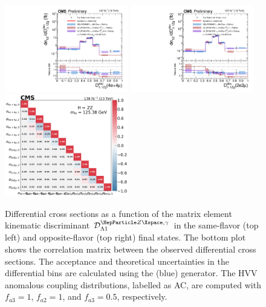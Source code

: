 \clearpage

\begin{center}
	\begin{figure}[!htb]
		\centering
		\includegraphics[width=0.48\textwidth]{Images/H4L/discriminants/model_v4/DL1Zg_unfoldwith_4l_SM_125_logscale_asimov.pdf}
		\includegraphics[width=0.48\textwidth]{Images/H4L/discriminants/model_v4/DL1Zg_unfoldwith_2e2mu_SM_125_logscale_asimov.pdf}\\
		\includegraphics[width=0.48\textwidth]{Images/H4L/correlations/corr_DL1Zg_v4.pdf}\\
		\caption{
			Differential cross sections as a function of the matrix element kinematic discriminant $\DLoneZg$ in the same-flavor (top left) and opposite-flavor (top right)  final states.
			The bottom plot shows the correlation matrix between the observed differential cross sections.
			The acceptance and theoretical uncertainties in the differential bins are calculated using the \POWHEG (blue) generator.
			The HVV anomalous coupling distributions, labelled as AC, are computed with $f_{a3} = 1$, $f_{a2} = 1$, and $f_{a3} = 0.5$, respectively.
			\label{fig:fidDL1ZG}}
	\end{figure}
\end{center}

